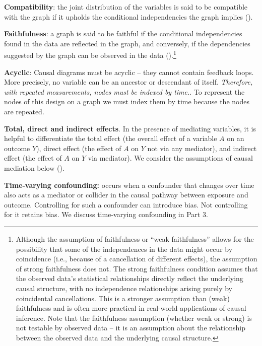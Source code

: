 \documentclass[
  singlecolumn,
  9pt]{article}
\begin{document}
\textbf{Compatibility}: the joint distribution of the variables is said
to be compatible with the graph if it upholds the conditional
independencies the graph implies ().

\textbf{Faithfulness}: a graph is said to be faithful if the conditional
independencies found in the data are reflected in the graph, and
conversely, if the dependencies suggested by the graph can be observed
in the data ().\footnote{Although the assumption of faithfulness or ``weak
  faithfulness'' allows for the possibility that some of the
  independences in the data might occur by coincidence (i.e., because of
  a cancellation of different effects), the assumption of strong
  faithfulness does not. The strong faithfulness condition assumes that
  the observed data's statistical relationships directly reflect the
  underlying causal structure, with no independence relationships
  arising purely by coincidental cancellations. This is a stronger
  assumption than (weak) faithfulness and is often more practical in
  real-world applications of causal inference. Note that the
  faithfulness assumption (whether weak or strong) is not testable by
  observed data -- it is an assumption about the relationship between
  the observed data and the underlying causal structure.}

\textbf{Acyclic}: Causal diagrams must be acyclic -- they cannot contain
feedback loops. More precisely, no variable can be an ancestor or
descendant of itself. \emph{Therefore, with repeated measurements, nodes
must be indexed by time.}. To represent the nodes of this design on a
graph we must index them by time because the nodes are repeated.

\textbf{Total, direct and indirect effects}. In the presence of
mediating variables, it is helpful to differentiate the total effect
(the overall effect of a variable \(A\) on an outcome \(Y\)), direct
effect (the effect of \(A\) on \(Y\) not via any mediator), and indirect
effect (the effect of \(A\) on \(Y\) via mediator). We consider the
assumptions of causal mediation below
().

\textbf{Time-varying confounding:} occurs when a confounder that changes
over time also acts as a mediator or collider in the causal pathway
between exposure and outcome. Controlling for such a confounder can
introduce bias. Not controlling for it retains bias. We discuss
time-varying confounding in Part 3.
\end{document}
